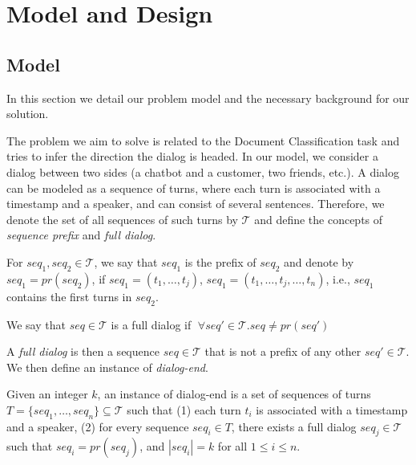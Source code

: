 \section{Model and Design}\label{sec:model}

\subsection{Model}
In this section we detail our problem model and the necessary background 
for our solution.

The problem we aim to solve is related to the Document Classification task 
\cite{attention,Slonim:2002:UDC:564376.564401,DBLP:journals/tkde/IsaLKR08} 
and tries to infer the direction the dialog is headed. 
In our model, we consider a dialog between two sides (a chatbot and a customer, two friends, etc.). 
A dialog can be modeled as a sequence of turns, 
where each turn is associated with a timestamp and a speaker, and can consist of several sentences. 
Therefore, we denote the set of all sequences of 
such turns by $\mathcal{T}$ and define the concepts of {\em sequence prefix} and {\em full dialog}. 

\begin{definition}
For $seq_1, seq_2 \in \mathcal{T}$, we say that $seq_1$ is the 
prefix of $seq_2$ and denote by $seq_1 = pr(seq_2)$, if 
$seq_1 = (t_1, \ldots, t_j)$, $seq_1 = (t_1, \ldots, t_j, \ldots, t_n)$, i.e., $seq_1$ contains the first 
turns in $seq_2$. 

We say that $seq \in \mathcal{T}$ is a full dialog if $\;\forall seq' \in \mathcal{T}. seq \neq pr(seq')\; $ 
\end{definition}

A {\em full dialog} is then a sequence $seq \in \mathcal{T}$ that is not a prefix 
of any other $seq' \in \mathcal{T}$. 
We then define an instance of {\em dialog-end}. 

\begin{definition}\label{def:target}
Given an integer $k$, an instance of dialog-end is a set of sequences of turns $T=\{seq_1, \ldots, seq_n\} \subseteq \mathcal{T}$ such that 
(1) each turn $t_i$ is associated with a timestamp and a speaker, (2) for every sequence $seq_i\in T$, there exists a full dialog $seq_j\in \mathcal{T}$ such that $seq_i = pr(seq_j)$, and $|seq_i| = k$ for all $1\leq i \leq n$.
\end{definition}

